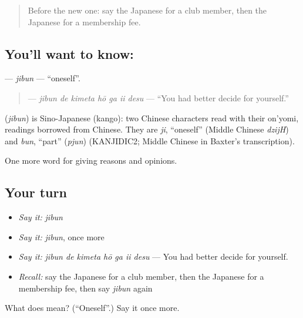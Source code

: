 \begin{quote}
Before the new one: say the Japanese for a club member, then the Japanese for a membership fee.
\end{quote}

\subsection*{You'll want to know: }
\textbf{} — \emph{jibun} — \textquotedblleft{}oneself\textquotedblright{}.

\begin{quote}
\textbf{   } — \emph{jibun de kimeta hō ga ii desu} — \textquotedblleft{}You had better decide for yourself.\textquotedblright{}
\end{quote}

\begin{cousinweb}
\textbf{} (\emph{jibun}) is Sino-Japanese (kango): two Chinese characters read with their on'yomi, readings borrowed from Chinese. They are \emph{ji}, \textquotedblleft{}oneself\textquotedblright{} (Middle Chinese \emph{dzijH}) and \emph{bun}, \textquotedblleft{}part\textquotedblright{} (\emph{pjun}) (KANJIDIC2; Middle Chinese in Baxter's transcription).
\end{cousinweb}

\begin{grammarlens}[title={What you've built}]
One more word for giving reasons and opinions.
\end{grammarlens}

\subsection*{Your turn}
\begin{itemize}
\raggedright
  \item \emph{Say it:} \emph{jibun}
  \item \emph{Say it:} \emph{jibun}, once more
  \item \emph{Say it:} \emph{jibun de kimeta hō ga ii desu} — You had better decide for yourself.
  \item \emph{Recall:} say the Japanese for a club member, then the Japanese for a membership fee, then say \emph{jibun} again
\end{itemize}

\begin{tcolorbox}[breakable,colback=teal!4,colframe=teal!35!black,title={Before you move on}]
What does  mean? (\textquotedblleft{}Oneself\textquotedblright{}.) Say it once more.
\end{tcolorbox}
